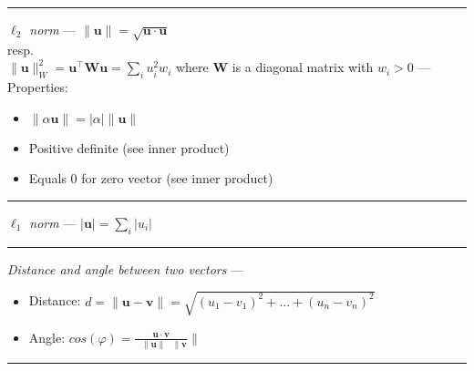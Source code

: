 {\color{lightgray}\hrule height 0.001mm}

\emph{$\ell_2$ norm} --- 
$\|\boldsymbol{u}\| = \sqrt{\boldsymbol{u} \cdot \boldsymbol{u}}$\\
resp.\\
$\|\boldsymbol{u}\|_W^2 = \boldsymbol{u}^\intercal \boldsymbol{W} \boldsymbol{u} = \sum_i u_i^2 w_i$ where $\boldsymbol{W}$ is a diagonal matrix with $w_i > 0$ --- 
Properties:
\begin{multicols}{2}
\begin{itemize}
    \item $\|\alpha\boldsymbol{u}\| = |\alpha| \|\boldsymbol{u}\|$
    \item Positive definite (see inner product)
    \item Equals 0 for zero vector (see inner product)
\end{itemize}
\end{multicols}

{\color{lightgray}\hrule height 0.001mm}

\emph{$\ell_1$ norm} --- 
$|\boldsymbol{u}| = \sum_i |u_i|$

{\color{lightgray}\hrule height 0.001mm}

\emph{Distance and angle between two vectors} --- 
\begin{itemize}
    \item Distance: $d = \| \boldsymbol{u} - \boldsymbol{v} \| = \sqrt{(u_1 - v_1)^2+...+(u_n - v_n)^2}$
    \item Angle: $cos(\varphi) = \frac{\boldsymbol{u} \cdot \boldsymbol{v}}{\textrm{ } \|\boldsymbol{u}\| \textrm{ } 
 \|\boldsymbol{v}}\|$
\end{itemize}

{\color{lightgray}\hrule height 0.001mm}

